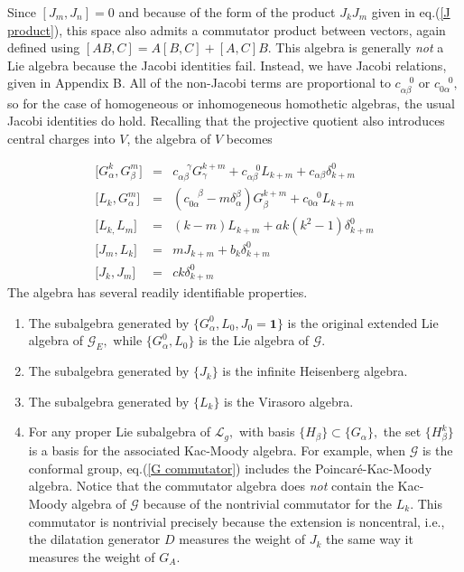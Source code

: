 \documentclass[a4paper,12pt]{article}
\begin{document}
Since $[J_{m},J_{n}]=0$ and because of the form of the product $J_{k}J_{m}$
given in eq.(\ref{J product}), this space also admits a commutator product
between vectors, again defined using $[AB,C]=A[B,C]+[A,C]B$. This algebra is
generally \textit{not} a Lie algebra because the Jacobi identities fail.
Instead, we have Jacobi relations, given in Appendix B. All of the
non-Jacobi terms are proportional to $c_{\alpha \beta }^{\quad 0}$ or $%
c_{0\alpha }^{\quad 0},$ so for the case of homogeneous or inhomogeneous
homothetic algebras, the usual Jacobi identities do hold. Recalling that the
projective quotient also introduces central charges into $\mathit{V}$, the
algebra of $\mathit{V}$ becomes

\begin{eqnarray}
\lbrack G_{\alpha }^{k},G_{\beta }^{m}] &=&c_{\alpha \beta }^{\quad \gamma
}G_{\gamma }^{k+m}+c_{\alpha \beta }^{\quad 0}L_{k+m}+c_{\alpha \beta
}\delta _{k+m}^{0}  \label{G commutator} \\
\lbrack L_{k},G_{\alpha }^{m}] &=&(c_{0\alpha }^{\quad \beta }-m\delta
_{\alpha }^{\beta })G_{\beta }^{k+m}+c_{0\alpha }^{\quad 0}L_{k+m} \\
\lbrack L_{k,}L_{m}] &=&(k-m)L_{k+m}+ak(k^{2}-1)\delta _{k+m}^{0} \\
\lbrack J_{m},L_{k}] &=&mJ_{k+m}+b_{k}\delta _{k+m}^{0} \\
\lbrack J_{k},J_{m}] &=&ck\delta _{k+m}^{0}
\end{eqnarray}
The algebra has several readily identifiable properties.

\begin{enumerate}
\item  The subalgebra generated by $\{G_{\alpha }^{0},L_{0},J_{0}=\mathbf{1}%
\}$ is the original extended Lie algebra of $\mathcal{G}_{E},$ while $%
\{G_{\alpha }^{0},L_{0}\}$ is the Lie algebra of $\mathcal{G}$.

\item  The subalgebra generated by $\{J_{k}\}$ is the infinite Heisenberg
algebra.

\item  The subalgebra generated by $\{L_{k}\}$ is the Virasoro algebra.

\item  For any proper Lie subalgebra of $\mathcal{L}_{g},$ with basis $%
\{H_{\beta }\}\subset \{G_{\alpha }\},$ the set $\{H_{\beta }^{k}\}$ is a
basis for the associated Kac-Moody algebra. For example, when $\mathcal{G}$
is the conformal group, eq.(\ref{G commutator}) includes the
Poincar\'{e}-Kac-Moody algebra. Notice that the commutator algebra does 
\textit{not} contain the Kac-Moody algebra of $\mathcal{G}$ because of the
nontrivial commutator for the $L_{k}.$ This commutator is nontrivial
precisely because the extension is noncentral, i.e., the dilatation
generator $D$ measures the weight of $J_{k}$ the same way it measures the
weight of $G_{A}.$
\end{enumerate}
\end{document}
